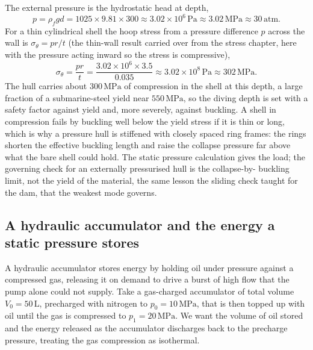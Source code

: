 The external pressure is the hydrostatic head at depth,
\[
p = \rho_f g d
= 1025 \times 9.81 \times 300
\approx 3.02 \times 10^6\,\text{Pa}
\approx 3.02\,\text{MPa} \approx 30\,\text{atm}.
\]
For a thin cylindrical shell the hoop stress from a pressure difference $p$
across the wall is $\sigma_\theta = p r/t$ (the thin-wall result carried
over from the stress chapter, here with the pressure acting inward so the
stress is compressive),
\[
\sigma_\theta = \frac{p r}{t}
= \frac{3.02 \times 10^6 \times 3.5}{0.035}
\approx 3.02 \times 10^8\,\text{Pa}
\approx 302\,\text{MPa}.
\]
The hull carries about $300\,\text{MPa}$ of compression in the shell at this
depth, a large fraction of a submarine-steel yield near $550\,\text{MPa}$,
so the diving depth is set with a safety factor against yield and, more
severely, against buckling. A shell in compression fails by buckling well
below the yield stress if it is thin or long, which is why a pressure hull
is stiffened with closely spaced ring frames: the rings shorten the
effective buckling length and raise the collapse pressure far above what the
bare shell could hold. The static pressure calculation gives the load; the
governing check for an externally pressurised hull is the collapse-by-
buckling limit, not the yield of the material, the same lesson the sliding
check taught for the dam, that the weakest mode governs.

\subsection{A hydraulic accumulator and the energy a static pressure stores}

A hydraulic accumulator stores energy by holding oil under pressure against
a compressed gas, releasing it on demand to drive a burst of high flow that
the pump alone could not supply. Take a gas-charged accumulator of total
volume $V_0 = 50\,\si{\liter}$, precharged with nitrogen to $p_0 = 10\,
\text{MPa}$, that is then topped up with oil until the gas is compressed to
$p_1 = 20\,\text{MPa}$. We want the volume of oil stored and the energy
released as the accumulator discharges back to the precharge pressure,
treating the gas compression as isothermal.

